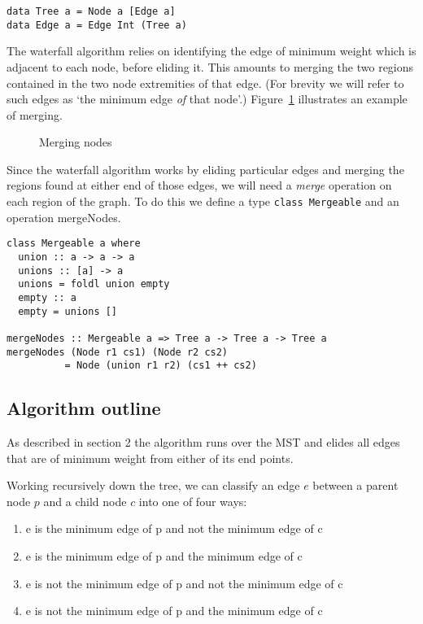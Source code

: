\documentclass{jfp}
\begin{document}
\begin{verbatim}
data Tree a = Node a [Edge a]
data Edge a = Edge Int (Tree a)
\end{verbatim}


The waterfall algorithm relies on identifying the edge of minimum
weight which is adjacent to each node, before eliding it. This amounts
to merging the two regions contained in the two node extremities of
that edge.  (For brevity we will refer to such edges as `the minimum
edge {\em of\/} that node'.) Figure~\ref{fig:merging} illustrates an
example of merging.

\begin{figure}
\centering
\ifpdf
\else
\fi
\caption{Merging nodes}
\label{fig:merging}
\end{figure}

Since the waterfall algorithm works by eliding particular edges and
merging the regions found at either end of those edges, we will need a
{\em merge} operation on each region of the graph. To do this we
define a type {\tt class Mergeable} and an operation mergeNodes.

\begin{verbatim}
class Mergeable a where
  union :: a -> a -> a
  unions :: [a] -> a
  unions = foldl union empty
  empty :: a
  empty = unions []

mergeNodes :: Mergeable a => Tree a -> Tree a -> Tree a
mergeNodes (Node r1 cs1) (Node r2 cs2)
          = Node (union r1 r2) (cs1 ++ cs2)
\end{verbatim}


\subsection{Algorithm outline}

As described in section 2 %
the algorithm runs over the MST and
elides all edges that are of minimum weight from either of its end
points.

Working recursively down the tree, we can classify an edge $e$ between
a parent node $p$ and a child node $c$ into one of four ways:
\begin{enumerate}[I]
\item e is     the minimum edge of p and not the minimum edge of c
\item e is     the minimum edge of p and     the minimum edge of c
\item e is not the minimum edge of p and not the minimum edge of c
\item e is not the minimum edge of p and     the minimum edge of c
\end{enumerate}
\end{document}
